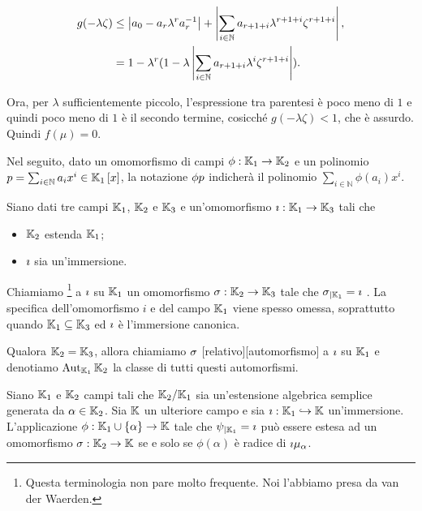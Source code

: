 \begin{align}
	g(- \lambda \zeta) &\leq \Abs{a_0 - a_r \lambda^r a_r^{-1}} + \Abs{\sum_{i \in \mathbb{N}} a_{r + 1 + i}\lambda^{r + 1 + i}\zeta^{r + 1 + i}},\\
	&= 1 - \lambda^r (1 - \lambda\Abs{\sum_{i \in \mathbb{N}} a_{r + 1 +i}\lambda^i\zeta^{r + 1 + i}}).
\end{align}
\par Ora, per $\lambda$ sufficientemente piccolo, l'espressione tra parentesi \`e poco meno di $1$ e quindi poco meno di $1$ \`e il secondo termine, cosicch\'e $g(- \lambda \zeta) < 1$, che \`e assurdo. Quindi $f(\mu) = 0$. \EndProof
\par Nel seguito, dato un omomorfismo di campi $\phi: \Field_1 \rightarrow \Field_2$ e un polinomio $p = \sum_{i \in \mathbb{N}} a_ix^i \in \RingAdjunction{\Field_1}{x}$, la notazione $\ImagePolynomial{\phi}{p}$ indicher\`a il polinomio $\sum_{i \in \mathbb{N}} \phi(a_i)x^i$.
\begin{Definition}
	Siano dati tre campi $\Field_1$, $\Field_2$ e $\Field_3$ e un'omomorfismo $\Immersion: \Field_1 \rightarrow \Field_3$ tali che
	\begin{itemize}
		\item $\Field_2$ estenda $\Field_1$;
		\item $\Immersion$ sia un'immersione.
	\end{itemize}
	Chiamiamo \footnote{Questa terminologia non pare molto frequente. Noi l'abbiamo presa da van der Waerden.} a $\Immersion$ su $\Field_1$ un omomorfismo $\RelativeHomomorphism: \Field_2 \rightarrow \Field_3$ tale che $\Restricted{\RelativeHomomorphism}{\Field_1} = \Immersion$ . La specifica dell'omomorfismo $i$ e del campo $\Field_1$ viene spesso omessa, soprattutto quando $\Field_1 \subseteq \Field_3$ ed $\Immersion$ \`e l'immersione canonica.
	\par Qualora $\Field_2 = \Field_3$, allora chiamiamo $\RelativeHomomorphism$ [relativo][automorfismo] a $\Immersion$  su $\Field_1$ e denotiamo $\RelativeAutomorphisms{\Field_2}{\Field_1}$ la classe di tutti questi automorfismi.
\end{Definition}
\begin{Theorem}\label{th_esistenzaomomorfismirelativi_0}
	Siano $\Field_1$ e $\Field_2$ campi tali che $\FieldExtension{\Field_2}{\Field_1}$ sia un'estensione algebrica semplice generata da $\alpha \in \Field_2$. Sia $\Field$ un ulteriore campo e sia $\Immersion: \Field_1 \hookrightarrow \Field$ un'immersione. L'applicazione $\phi: \Field_1 \cup \lbrace \alpha \rbrace \rightarrow \Field$ tale che $\Restricted{\psi}{\Field_1} = \Immersion$ pu\`o essere estesa ad un omomorfismo $\RelativeHomomorphism: \Field_2 \rightarrow \Field$ se e solo se $\phi(\alpha)$ \`e radice di $\ImagePolynomial{\Immersion}{\MinimalPolynomial{\alpha}}$.
\end{Theorem}

